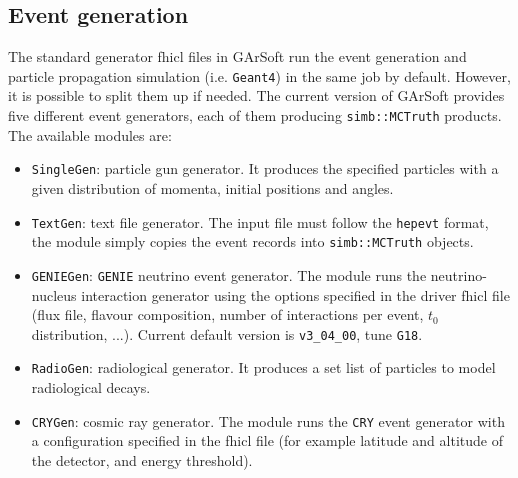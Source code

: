 \subsection{Event generation}

The standard generator \gls{fhicl} files in GArSoft run the event generation and particle propagation simulation (i.e. \texttt{Geant4}) in the same job by default. However, it is possible to split them up if needed. The current version of GArSoft provides five different event generators, each of them producing \texttt{simb::MCTruth} products. The available modules are:
\begin{itemize}
	\item \texttt{SingleGen}: particle gun generator. It produces the specified particles with a given distribution of momenta, initial positions and angles.
	\item \texttt{TextGen}: text file generator. The input file must follow the \texttt{hepevt} format, the module simply copies the event records into \texttt{simb::MCTruth} objects.
	\item \texttt{GENIEGen}: \texttt{GENIE} neutrino event generator. The module runs the neutrino-nucleus interaction generator using the options specified in the driver \gls{fhicl} file (flux file, flavour composition, number of interactions per event, $t_{0}$ distribution, ...). Current default version is \texttt{v3_04_00}, tune \texttt{G18}.
	\item \texttt{RadioGen}: radiological generator. It produces a set list of particles to model radiological decays.
	\item \texttt{CRYGen}: cosmic ray generator. The module runs the \texttt{CRY} event generator \cite{Hagmann2007} with a configuration specified in the \gls{fhicl} file (for example latitude and altitude of the detector, and energy threshold).
\end{itemize}

